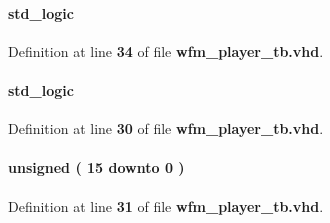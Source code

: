 \paragraph[{pct\+\_\+payload\+\_\+valid}]{ {\bfseries \textcolor{comment}{std\+\_\+logic}\textcolor{vhdlchar}{ }} \hspace{0.3cm}{\ttfamily [Signal]}}\label{classwfm__player__tb_1_1tb__behave_aed0d145c9cf3d9507af91d94ab5205c9}


Definition at line {\bf 34} of file {\bf wfm\+\_\+player\+\_\+tb.\+vhd}.

\paragraph[{pct\+\_\+wr}]{ {\bfseries \textcolor{comment}{std\+\_\+logic}\textcolor{vhdlchar}{ }} \hspace{0.3cm}{\ttfamily [Signal]}}\label{classwfm__player__tb_1_1tb__behave_a10f726b3d8a4b36ab81e1b7e490f293a}


Definition at line {\bf 30} of file {\bf wfm\+\_\+player\+\_\+tb.\+vhd}.

\paragraph[{pct\+\_\+wr\+\_\+cnt}]{ {\bfseries \textcolor{comment}{unsigned}\textcolor{vhdlchar}{ }\textcolor{vhdlchar}{(}\textcolor{vhdlchar}{ }\textcolor{vhdlchar}{ } \textcolor{vhdldigit}{15} \textcolor{vhdlchar}{ }\textcolor{keywordflow}{downto}\textcolor{vhdlchar}{ }\textcolor{vhdlchar}{ } \textcolor{vhdldigit}{0} \textcolor{vhdlchar}{ }\textcolor{vhdlchar}{)}\textcolor{vhdlchar}{ }} \hspace{0.3cm}{\ttfamily [Signal]}}\label{classwfm__player__tb_1_1tb__behave_a718567e38aaf1faebbbd3f2c67058771}


Definition at line {\bf 31} of file {\bf wfm\+\_\+player\+\_\+tb.\+vhd}.

